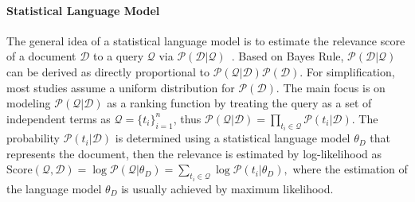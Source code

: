 \paragraph{Statistical Language Model}
The general idea of a statistical language model is to estimate the relevance score of a document $\mathcal{D}$ to a query $\mathcal{Q}$ via $\mathcal{P}(\mathcal{D}|\mathcal{Q})$~\cite{ponte1998language}. 
Based on Bayes Rule, $\mathcal{P}(\mathcal{D}|\mathcal{Q})$ can be derived as directly proportional to $\mathcal{P}(\mathcal{Q}|\mathcal{D})\mathcal{P}(\mathcal{D})$. 
For simplification, most studies assume a uniform distribution for $\mathcal{P}(\mathcal{D})$. 
The main focus is on modeling $\mathcal{P}(\mathcal{Q}|\mathcal{D})$ as a ranking function by treating the query as a set of independent terms as $\mathcal{Q}=\{t_i\}_{i=1}^n$, thus $\mathcal{P}(\mathcal{Q}|\mathcal{D})=\prod_{t_i \in \mathcal{Q}}\mathcal{P}(t_i|\mathcal{D}).$
The probability $\mathcal{P}(t_i|\mathcal{D})$ is determined using a statistical language model $\theta_{D}$ that represents the document, then the relevance is estimated by log-likelihood as
$\text{Score}(\mathcal{Q},\mathcal{D}) = \log\mathcal{P}(\mathcal{Q}|\theta_{D}) = \sum_{t_i \in \mathcal{Q}}\log\mathcal{P}(t_i|\theta_{D}),$
where the estimation of the language model $\theta_{D}$ is usually achieved by maximum likelihood.